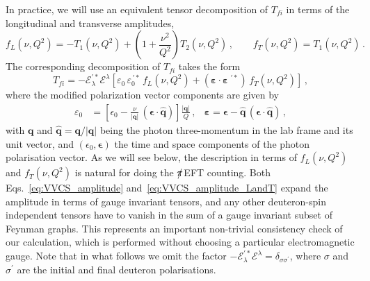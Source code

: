 \documentclass[prl,
twocolumn,
showpacs,preprintnumbers,amsmath,amssymb,
superscriptaddress,
a4paper,nofootinbib,longbibliography]{revtex4-2}
\def\eqlab#1{\label{eq:#1}}
\def\bv#1{\boldsymbol{#1}}
\begin{document}
In practice, we will use an equivalent
tensor decomposition of $T_{fi}$ in terms of the longitudinal and transverse amplitudes,
\begin{equation}
    f_L(\nu,Q^2) = -T_1(\nu,Q^2)+\left(1+\frac{\nu^2}{Q^2}\right)T_2(\nu,Q^2)\,, \qquad f_T(\nu,Q^2) = T_1(\nu,Q^2)\,.
\end{equation}
The corresponding decomposition of $T_{fi}$ takes the form
\begin{equation}
    T_{fi} = -\mathcal{E}^{'*}_\lambda\mathcal{E}^\lambda\left[\varepsilon_0\,\varepsilon_0^{\,\prime*}\,f_{L}(\nu,Q^2) +(\bv{\varepsilon} \cdot \bv{\varepsilon}^{\,\, \prime *}) \,f_{T}(\nu,Q^2)\right]\,,
\label{eq:VVCS_amplitude_LandT}
\end{equation}
where the modified polarization vector components are given by
\begin{align}
\varepsilon_0&=\left[\epsilon_0-\frac{\nu}{\left|\bv{q}\right|}\, (\bv{\epsilon}\cdot\bv{\hat q})\right]\frac{\left|\bv{q}\right|}{Q}\,,
&\bv{\varepsilon} = \bv{\epsilon}-\bv{\hat q}\,(\bv{\epsilon}\cdot\bv{\hat q})\,,\eqlab{modified_polarization_vectors}
\end{align}
with $\bv{q}$ and $\bv{\hat{q}}=\bv{q}/|\bv{q}|$ being the photon three-momentum in the lab frame and its unit vector, and $(\epsilon_0,\bv{\epsilon})$ the time and space components of the photon polarisation vector. As we will see below, the description in terms of $f_L(\nu,Q^2)$ and $f_T(\nu,Q^2)$ is natural for doing the $\slashed{\pi}$EFT counting. Both Eqs.~\eqref{eq:VVCS_amplitude} and~\eqref{eq:VVCS_amplitude_LandT} expand the amplitude in terms of gauge invariant tensors, and any other deuteron-spin independent tensors have to vanish in the sum of a gauge invariant subset of Feynman graphs. This represents an important non-trivial consistency check of our calculation, which is performed without choosing a particular electromagnetic gauge.
Note that in what follows we omit the factor 
$-\mathcal{E}^{'*}_\lambda\mathcal{E}^\lambda=\delta_{\sigma\sigma^{'}}$, where $\sigma$ and $\sigma^{'}$ are the initial and final deuteron polarisations. 
\end{document}

